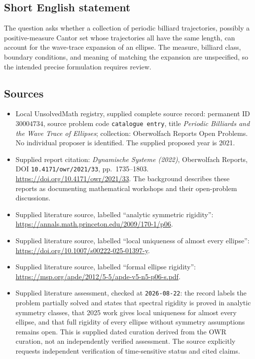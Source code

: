 \documentclass[11pt]{article}
\begin{document}
\subsection{Short English statement}
The question asks whether a collection of periodic billiard trajectories, possibly a positive-measure Cantor set whose trajectories all have the same length, can account for the wave-trace expansion of an ellipse. The measure, billiard class, boundary conditions, and meaning of matching the expansion are unspecified, so the intended precise formulation requires review.
\subsection{Sources}
\begin{itemize}
\item Local UnsolvedMath registry, supplied complete source record: permanent ID \(30004734\), source problem code \texttt{catalogue entry}, title \emph{Periodic Billiards and the Wave Trace of Ellipses}; collection: Oberwolfach Reports Open Problems. No individual proposer is identified. The supplied proposed year is 2021.
\item Supplied report citation: \emph{Dynamische Systeme (2022)}, Oberwolfach Reports, DOI \texttt{10.4171/owr/2021/33}, pp.\ 1735--1803. \url{https://doi.org/10.4171/owr/2021/33}. The background describes these reports as documenting mathematical workshops and their open-problem discussions.
\item Supplied literature source, labelled ``analytic symmetric rigidity'': \url{https://annals.math.princeton.edu/2009/170-1/p06}.
\item Supplied literature source, labelled ``local uniqueness of almost every ellipse'': \url{https://doi.org/10.1007/s00222-025-01397-y}.
\item Supplied literature source, labelled ``formal ellipse rigidity'': \url{https://msp.org/apde/2012/5-5/apde-v5-n5-p06-s.pdf}.
\item Supplied literature assessment, checked at \texttt{2026-08-22}: the record labels the problem partially solved and states that spectral rigidity is proved in analytic symmetry classes, that 2025 work gives local uniqueness for almost every ellipse, and that full rigidity of every ellipse without symmetry assumptions remains open. This is supplied dated curation derived from the OWR curation, not an independently verified assessment. The source explicitly requests independent verification of time-sensitive status and cited claims.
\end{itemize}
\end{document}
